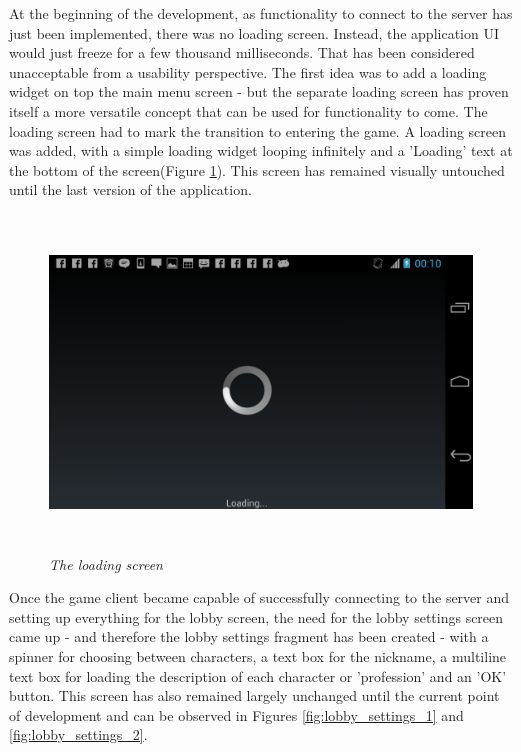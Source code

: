 At the beginning of the development, as functionality to connect to the server
has just been implemented, there was no loading screen. Instead, the application
UI would just freeze for a few thousand milliseconds. That has been considered
unacceptable from a usability perspective. The first idea was to add a loading
widget on top the main menu screen - but the separate loading screen has proven
itself a more versatile concept that can be used for functionality to come. The
loading screen had to mark the transition to entering the game. A loading screen
was added, with a simple loading widget looping infinitely and a 'Loading' text
at the bottom of the screen(Figure \ref{fig:loading}). This screen has remained
visually untouched until the last version of the application.\newline

\begin{figure}
\includegraphics[height=3.5in,width=6.23in]{./images/android_screenshots/tutorial_loading.png}
\caption{\small \sl The loading screen\label{fig:loading}}
\end{figure}

Once the game client became capable of successfully connecting to the server and
setting up everything for the lobby screen, the need for the lobby settings
screen came up - and therefore the lobby settings fragment has been created -
with a spinner for choosing between characters, a text box for the nickname, a
multiline text box for loading the description of each character or
'profession' and an 'OK' button. This screen has also remained largely unchanged until the
current point of development and can be observed in Figures
\ref{fig:lobby_settings_1} and \ref{fig:lobby_settings_2}.


